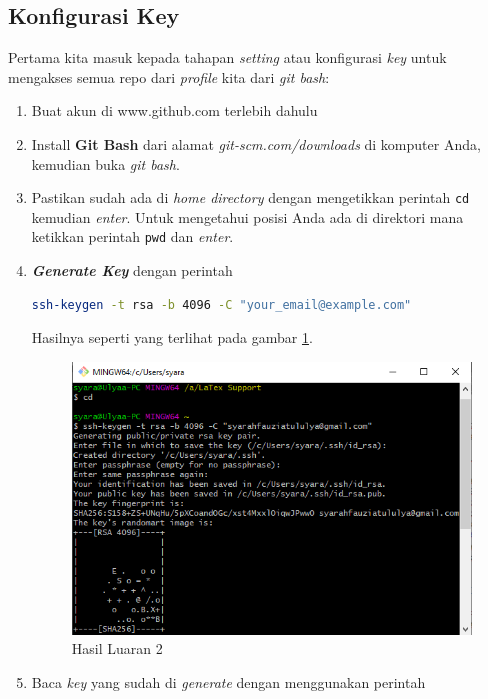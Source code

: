 \subsection{Konfigurasi Key}
Pertama kita masuk kepada tahapan \textit{setting} atau konfigurasi \textit{key} untuk mengakses semua repo dari \textit{profile} kita dari \textit{git bash}:
\begin{enumerate}

\item Buat akun di www.github.com terlebih dahulu
\item Install \textbf{Git Bash} dari alamat \textit{git-scm.com/downloads} di komputer Anda, kemudian buka \textit{git bash}.
\item Pastikan sudah ada di \textit{home directory} dengan mengetikkan perintah \verb|cd| kemudian \textit{enter}. Untuk mengetahui posisi Anda ada di direktori mana ketikkan perintah \verb|pwd| dan \textit{enter}.
\item \textbf{\textit{Generate Key}} dengan perintah 

\begin{lstlisting}[language=bash, caption=Perintah Membuat Key,breaklines]
ssh-keygen -t rsa -b 4096 -C "your_email@example.com"
\end{lstlisting}
Hasilnya seperti yang terlihat pada gambar \ref{luaran1}.
\begin{figure}[!htbp]
\centerline{\includegraphics[width=.75\textwidth]{Figures/langkah1.PNG}}
\caption{Hasil Luaran 2}
\label{luaran1}
\end{figure}
\item Baca \textit{key} yang sudah di \textit{generate} dengan menggunakan perintah 


\end{enumerate}
